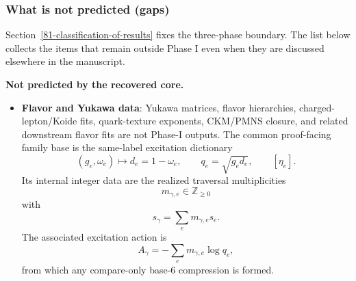 \subsubsection{What is not predicted (gaps)}\label{84-what-is-not-predicted-gaps}

Section~\ref{81-classification-of-results} fixes the three-phase boundary. The list below collects the items that remain outside Phase I even when they are discussed elsewhere in the manuscript.

\textbf{Not predicted by the recovered core.}
\begin{itemize}
\item \textbf{Flavor and Yukawa data}: Yukawa matrices, flavor hierarchies, charged-lepton/Koide fits, quark-texture exponents, CKM/PMNS closure, and related downstream flavor fits are not Phase-I outputs. The common proof-facing family base is the same-label excitation dictionary
\[
(g_e,\omega_e)\longmapsto d_e=1-\omega_e,\qquad q_e=\sqrt{g_e d_e},\qquad [\eta_e].
\]
Its internal integer data are the realized traversal multiplicities
\[
m_{\gamma,e}\in\mathbb Z_{\ge0}
\]
with
\[
s_\gamma=\sum_e m_{\gamma,e}s_e.
\]
The associated excitation action is
\[
A_\gamma=-\sum_e m_{\gamma,e}\log q_e,
\]
from which any compare-only base-6 compression is formed.

\end{itemize}
